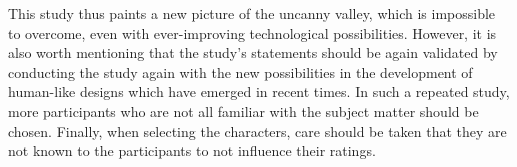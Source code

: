 This study thus paints a new picture of the uncanny valley, which is impossible to overcome, even with ever-improving technological possibilities. However, it is also worth mentioning that the study's statements should be again validated by conducting the study again with the new possibilities in the development of human-like designs which have emerged in recent times. In such a repeated study, more participants who are not all familiar with the subject matter should be chosen. Finally, when selecting the characters, care should be taken that they are not known to the participants to not influence their ratings.







